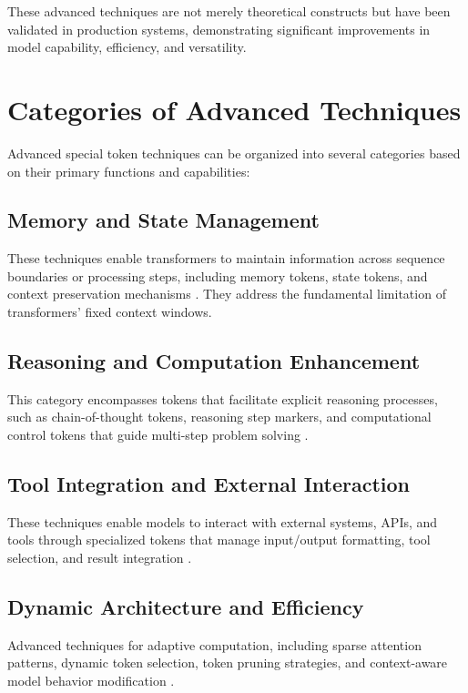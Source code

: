These advanced techniques are not merely theoretical constructs but have been validated in production systems, demonstrating significant improvements in model capability, efficiency, and versatility.

\section{Categories of Advanced Techniques}

Advanced special token techniques can be organized into several categories based on their primary functions and capabilities:

\subsection{Memory and State Management}

These techniques enable transformers to maintain information across sequence boundaries or processing steps, including memory tokens, state tokens, and context preservation mechanisms \citep{beltagy2020longformer}. They address the fundamental limitation of transformers' fixed context windows.

\subsection{Reasoning and Computation Enhancement}

This category encompasses tokens that facilitate explicit reasoning processes, such as chain-of-thought tokens, reasoning step markers, and computational control tokens that guide multi-step problem solving \citep{wei2022chain, kojima2022large}.

\subsection{Tool Integration and External Interaction}

These techniques enable models to interact with external systems, APIs, and tools through specialized tokens that manage input/output formatting, tool selection, and result integration \citep{schick2023toolformer, qin2023tool, patil2023gorilla}.

\subsection{Dynamic Architecture and Efficiency}

Advanced techniques for adaptive computation, including sparse attention patterns, dynamic token selection, token pruning strategies, and context-aware model behavior modification \citep{child2019generating, fedus2022switch, kitaev2020reformer}.

